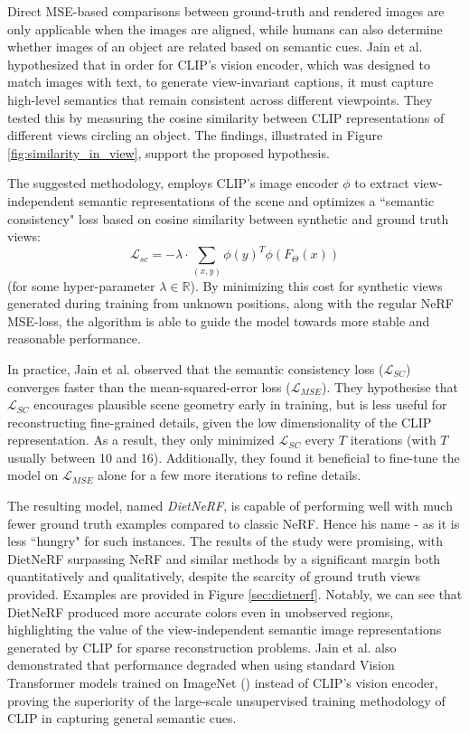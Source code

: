 \documentclass{article}
\begin{document}
\medskip
\noindent
Direct MSE-based comparisons between ground-truth and rendered images are only applicable when the images are aligned, while humans can also determine whether images of an object are related based on semantic cues. Jain et al. hypothesized that in order for CLIP's vision encoder, which was designed to match images with text, to generate view-invariant captions, it must capture high-level semantics that remain consistent across different viewpoints. They tested this by measuring the cosine similarity between CLIP representations of different views circling an object. The findings, illustrated in Figure \ref{fig:similarity_in_view}, support the proposed hypothesis.

\medskip
\noindent
The suggested methodology, employs CLIP's image encoder $\phi$ to extract view-independent semantic representations of the scene and optimizes a ``semantic consistency" loss based on cosine similarity between synthetic and ground truth views:
\begin{equation*}
    \mathcal{L}_{sc} = -\lambda \cdot \sum_{(x,y)}{\phi(y)^T \phi(F_{\Theta}(x))}
\end{equation*}
(for some hyper-parameter $\lambda \in \mathbb{R}$). By minimizing this cost for synthetic views generated during training from unknown positions, along with the regular NeRF MSE-loss, the algorithm is able to guide the model towards more stable and reasonable performance.

\medskip
\noindent
In practice, Jain et al. observed that the semantic consistency loss ($\mathcal{L}_{SC}$) converges faster than the mean-squared-error loss ($\mathcal{L}_{MSE}$). They hypothesise that $\mathcal{L}_{SC}$ encourages plausible scene geometry early in training, but is less useful for reconstructing fine-grained details, given the low dimensionality of the CLIP representation. As a result, they only minimized $\mathcal{L}_{SC}$ every $T$ iterations (with $T$ usually between 10 and 16). Additionally, they found it beneficial to fine-tune the model on $\mathcal{L}_{MSE}$ alone for a few more iterations to refine details.

\medskip
\noindent
The resulting model, named \emph{DietNeRF}, is capable of performing well with much fewer ground truth examples compared to classic NeRF. Hence his name - as it is less ``hungry" for such instances. The results of the study were promising, with DietNeRF surpassing NeRF and similar methods by a significant margin both quantitatively and qualitatively, despite the scarcity of ground truth views provided. Examples are provided in Figure \ref{sec:dietnerf}. Notably, we can see that DietNeRF produced more accurate colors even in unobserved regions, highlighting the value of the view-independent semantic image representations generated by CLIP for sparse reconstruction problems. Jain et al. also demonstrated that performance degraded when using standard Vision Transformer models trained on ImageNet (\citet{deng2009imagenet}) instead of CLIP's vision encoder, proving the superiority of the large-scale unsupervised training methodology of CLIP in capturing general semantic cues. 
\end{document}
